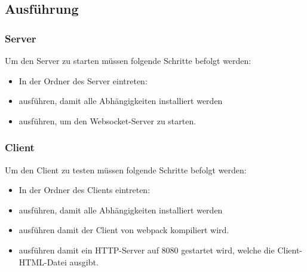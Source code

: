 \subsection{Ausführung}

\subsubsection{Server}
Um den Server zu starten müssen folgende Schritte befolgt werden:
\begin{itemize}
	\item In der Ordner des Server eintreten: 
	\item {} ausführen, damit alle Abhängigkeiten installiert werden
	\item {} ausführen, um den Websocket-Server zu starten.
\end{itemize}

\subsubsection{Client}
Um den Client zu testen müssen folgende Schritte befolgt werden:
\begin{itemize}
	\item In der Ordner des Clients eintreten: 
	\item {} ausführen, damit alle Abhängigkeiten installiert werden
	\item {} ausführen damit der Client von webpack kompiliert wird.
	\item {} ausführen damit ein HTTP-Server auf 8080 gestartet wird, welche die Client-HTML-Datei ausgibt.
\end{itemize}





